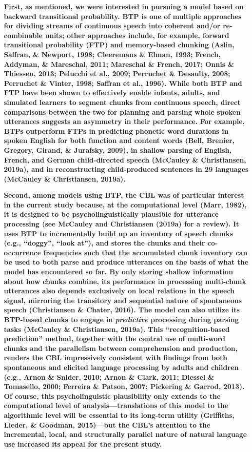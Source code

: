 \documentclass[
  english,
  man,mask,floatsintext]{apa6}
\begin{document}
\textbf{First, as mentioned, we were interested in pursuing a model based on backward transitional probability. BTP is one of multiple approaches for dividing streams of continuous speech into coherent and/or re-combinable units; other approaches include, for example, forward transitional probability (FTP) and memory-based chunking (Aslin, Saffran, \& Newport, 1998; Cleeremans \& Elman, 1993; French, Addyman, \& Mareschal, 2011; Mareschal \& French, 2017; Onnis \& Thiessen, 2013; Pelucchi et al., 2009; Perruchet \& Desaulty, 2008; Perruchet \& Vinter, 1998; Saffran et al., 1996). While both BTP and FTP have been shown to effectively enable infants, adults, and simulated learners to segment chunks from continuous speech, direct comparisons between the two for planning and parsing whole spoken utterances suggests an asymmetry in their performance. For example, BTPs outperform FTPs in predicting phonetic word durations in spoken English for both function and content words (Bell, Brenier, Gregory, Girand, \& Jurafsky, 2009), in shallow parsing of English, French, and German child-directed speech (McCauley \& Christiansen, 2019a), and in reconstructing child-produced sentences in 29 languages (McCauley \& Christiansen, 2019a).}

\textbf{Second, among models using BTP, the CBL was of particular interest in the current study because, at the computational level (Marr, 1982), it is designed to be psycholinguistically plausible for utterance processing (see McCauley and Christiansen (2019a) for a review). It uses BTP to incrementally build up an inventory of speech chunks (e.g., \enquote{doggy}, \enquote{look at}), and stores the chunks and their co-occurrence frequencies such that the accumulated chunk inventory can be used to both parse and produce utterances on the basis of what the model has encountered so far. By only storing shallow information about how chunks combine, its performance in processing multi-chunk utterances also depends exclusively on local relations in the speech signal, mirroring the transitory and sequential nature of spontaneous speech (Christiansen \& Chater, 2016). The model can also utilize its BTP-based chunks to engage in \emph{predictive} processing during parsing tasks (McCauley \& Christiansen, 2019a). This \enquote{recognition-based prediction} method, together with the central use of multi-word chunks and the parallelism between comprehension and production, renders the CBL impressively consistent with findings from both spontaneous and elicited language processing by adults and children (e.g., Arnon \& Snider, 2010; Arnon \& Clark, 2011; Diessel \& Tomasello, 2000; Ferreira \& Patson, 2007; Pickering \& Garrod, 2013). Of course, this psycholinguistic plausibility only extends to the computational level of analysis---translations of this model to the algorithmic level will be essential to its long-term utility (Griffiths, Lieder, \& Goodman, 2015)---but the CBL's attention to the incremental, local, and structurally parallel nature of natural language use increased its appeal for the present study.}
\end{document}

